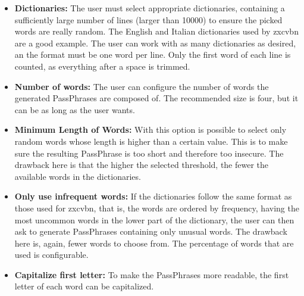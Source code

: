 \begin{itemize}
\setlength\itemsep{-3pt}

\item \textbf{Dictionaries: }The user must select appropriate dictionaries, containing a sufficiently large number of lines (larger than 10000) to ensure the picked words are really random. The English and Italian dictionaries used by zxcvbn are a good example. The user can work with as many dictionaries as desired, an the format must be one word per line. Only the first word of each line is counted, as everything after a space is trimmed.

\item \textbf{Number of words: }The user can configure the number of words the generated PassPhrases are composed of. The recommended size is four, but it can be as long as the user wants.

\item \textbf{Minimum Length of Words: }With this option is possible to select only random words whose length is higher than a certain value. This is to make sure the resulting PassPhrase is too short and therefore too insecure. The drawback here is that the higher the selected threshold, the fewer the available words in the dictionaries.

\item \textbf{Only use infrequent words: }If the dictionaries follow the same format as those used for zxcvbn, that is, the words are ordered by frequency, having the most uncommon words in the lower part of the dictionary, the user can then ask to generate PassPhrases containing only unusual words. The drawback here is, again, fewer words to choose from. The percentage of words that are used is configurable.

\item \textbf{Capitalize first letter: }To make the PassPhrases more readable, the first letter of each word can be capitalized.
\end{itemize}